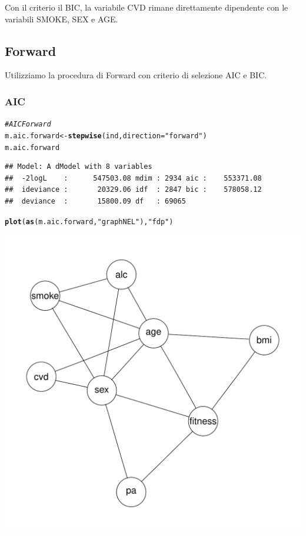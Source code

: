 \documentclass{article}\usepackage[]{graphicx}\usepackage[]{xcolor}
\makeatletter
\def\maxwidth{ %
  \ifdim\Gin@nat@width>\linewidth
    \linewidth
  \else
    \Gin@nat@width
  \fi
}
\newcommand{\hlstr}[1]{\textcolor[rgb]{0.192,0.494,0.8}{#1}}%
\newcommand{\hlcom}[1]{\textcolor[rgb]{0.678,0.584,0.686}{\textit{#1}}}%
\newcommand{\hlstd}[1]{\textcolor[rgb]{0.345,0.345,0.345}{#1}}%
\newcommand{\hlkwb}[1]{\textcolor[rgb]{0.69,0.353,0.396}{#1}}%
\newcommand{\hlkwc}[1]{\textcolor[rgb]{0.333,0.667,0.333}{#1}}%
\newcommand{\hlkwd}[1]{\textcolor[rgb]{0.737,0.353,0.396}{\textbf{#1}}}%
\newenvironment{kframe}{%
 \def\at@end@of@kframe{}%
 \ifinner\ifhmode%
  \def\at@end@of@kframe{\end{minipage}}%
  \begin{minipage}{\columnwidth}%
 \fi\fi%
 \def\FrameCommand##1{\hskip\@totalleftmargin \hskip-\fboxsep
 \colorbox{shadecolor}{##1}\hskip-\fboxsep
     \hskip-\linewidth \hskip-\@totalleftmargin \hskip\columnwidth}%
 \MakeFramed {\advance\hsize-\width
   \@totalleftmargin\z@ \linewidth\hsize
   \@setminipage}}%
 {\par\unskip\endMakeFramed%
 \at@end@of@kframe}
\newenvironment{knitrout}{}{} %
\makeatother
\begin{document}
      Con il criterio il BIC, la variabile CVD rimane direttamente dipendente
      con le variabili SMOKE, SEX e AGE.
      
  \subsection{Forward}
    Utilizziamo la procedura di Forward con criterio di selezione AIC e BIC.

    \subsubsection{AIC}
\begin{knitrout}
\color{fgcolor}\begin{kframe}
\begin{alltt}
\hlcom{#AIC Forward}
\hlstd{m.aic.forward} \hlkwb{<-} \hlkwd{stepwise}\hlstd{(ind,} \hlkwc{direction}\hlstd{=}\hlstr{"forward"}\hlstd{)}
\hlstd{m.aic.forward}
\end{alltt}
\begin{verbatim}
## Model: A dModel with 8 variables
##  -2logL    :      547503.08 mdim : 2934 aic :    553371.08 
##  ideviance :       20329.06 idf  : 2847 bic :    578058.12 
##  deviance  :       15800.09 df   : 69065
\end{verbatim}
\begin{alltt}
\hlkwd{plot}\hlstd{(}\hlkwd{as}\hlstd{(m.aic.forward,} \hlstr{"graphNEL"}\hlstd{),} \hlstr{"fdp"}\hlstd{)}
\end{alltt}
\end{kframe}
\includegraphics[width=\maxwidth]{figure/Grafo_AIC_Forward-1} 
\end{knitrout}
     
\end{document}
